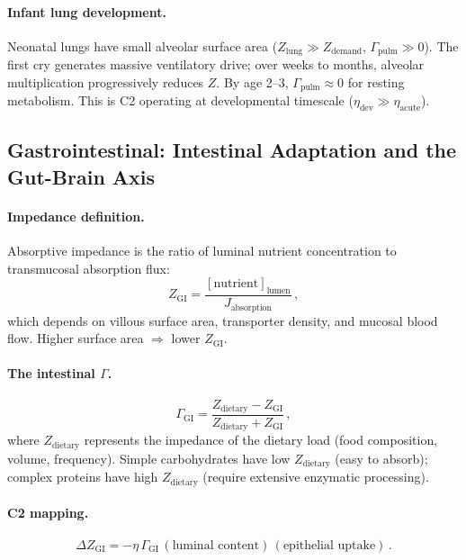 \documentclass[aps,pre,twocolumn,superscriptaddress,floatfix]{revtex4-2}
\begin{document}
\paragraph{Infant lung development.}
Neonatal lungs have small alveolar surface area
($Z_{\text{lung}} \gg Z_{\text{demand}}$,
$\Gamma_{\text{pulm}} \gg 0$).
The first cry generates massive ventilatory drive;
over weeks to months, alveolar multiplication
progressively reduces $Z$.  By age 2--3,
$\Gamma_{\text{pulm}} \approx 0$ for resting
metabolism.  This is C2 operating at developmental
timescale ($\eta_{\text{dev}} \gg
\eta_{\text{acute}}$).


\subsection{Gastrointestinal: Intestinal Adaptation and the Gut-Brain Axis}
\label{sec:GI}

\paragraph{Impedance definition.}
Absorptive impedance is the ratio of luminal
nutrient concentration to transmucosal absorption
flux:
\begin{equation}
  Z_{\text{GI}} = \frac{[\text{nutrient}]_{\text{lumen}}}
                       {J_{\text{absorption}}}\,,
  \label{eq:z-gi}
\end{equation}
which depends on villous surface area, transporter
density, and mucosal blood flow.  Higher surface area
$\Rightarrow$ lower $Z_{\text{GI}}$.

\paragraph{The intestinal $\Gamma$.}
\begin{equation}
  \Gamma_{\text{GI}} =
  \frac{Z_{\text{dietary}} - Z_{\text{GI}}}
       {Z_{\text{dietary}} + Z_{\text{GI}}}\,,
  \label{eq:gamma-gi}
\end{equation}
where $Z_{\text{dietary}}$ represents the impedance
of the dietary load (food composition, volume,
frequency).  Simple carbohydrates have low
$Z_{\text{dietary}}$ (easy to absorb);
complex proteins have high $Z_{\text{dietary}}$
(require extensive enzymatic processing).

\paragraph{C2 mapping.}
\begin{equation}
  \Delta Z_{\text{GI}} =
  -\eta\,\Gamma_{\text{GI}}\,
  (\text{luminal content})\,
  (\text{epithelial uptake})\,.
  \label{eq:c2-gi}
\end{equation}
\end{document}
